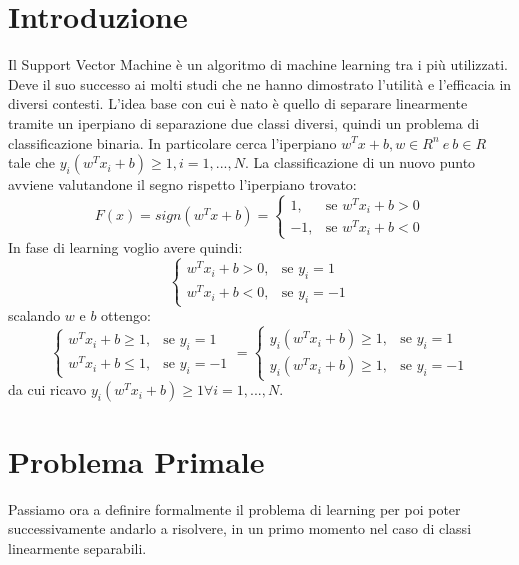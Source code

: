 \documentclass{report}
\begin{document}
\section{Introduzione}
Il Support Vector Machine è un algoritmo di machine learning tra i più utilizzati. Deve il suo successo ai molti studi che ne hanno dimostrato l'utilità e l'efficacia in diversi contesti. L'idea base con cui è nato è quello di separare linearmente tramite un iperpiano di separazione due classi diversi, quindi un problema di classificazione binaria. In particolare cerca l'iperpiano $w^Tx+b, w \in R^n\ e\ b \in R$ tale che $y_i(w^T x_i+b) \geqslant 1, i = 1,...,N$. La classificazione di un nuovo punto avviene valutandone il segno rispetto l'iperpiano trovato:
\begin{equation} 
	F(x) = sign (w^T x+b) =	
	\begin{cases}
		1, & \mbox{se } w^Tx_i+b > 0 \\ 
		-1, & \mbox{se } w^Tx_i+b < 0 
	\end{cases}
\end{equation}
In fase di learning voglio avere quindi:
\begin{equation} 
	\begin{cases}
		 w^Tx_i+b > 0, & \mbox{se } y_i = 1 \\ 
		w^Tx_i+b < 0, & \mbox{se } y_i = -1
	\end{cases}
\end{equation}
scalando $w$ e $b$ ottengo:
\begin{equation} 
	\begin{cases}
		 w^Tx_i+b \geqslant 1, & \mbox{se } y_i = 1 \\ 
		w^Tx_i+b \leqslant 1, & \mbox{se } y_i = -1
	\end{cases}
	=
	\begin{cases}
		 y_i (w^Tx_i+b) \geqslant 1, & \mbox{se } y_i = 1 \\ 
		y_i (w^Tx_i+b) \geqslant 1, & \mbox{se } y_i = -1
	\end{cases}
\end{equation}
da cui ricavo $y_i (w^Tx_i+b) \geqslant 1 \forall i = 1,...,N$.

\section{Problema Primale}
Passiamo ora a definire formalmente il problema di learning per poi poter successivamente andarlo a risolvere, in un primo momento nel caso di classi linearmente separabili.\\
\end{document}
